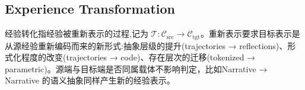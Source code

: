 \subsection{Experience Transformation}
\label{sec:transformation}

经验转化指经验被重新表示的过程,记为 $\mathcal{T}: \mathcal{C}_{\text{src}} \rightarrow \mathcal{C}_{\text{tgt}}$。重新表示要求目标表示是从源经验重新编码而来的新形式:抽象层级的提升(trajectories → reflections)、形式化程度的改变(trajectories → code)、存在层次的迁移(tokenized → parametric)。源端与目标端是否同属载体不影响判定，比如Narrative → Narrative 的语义抽象同样产生新的经验表示。

